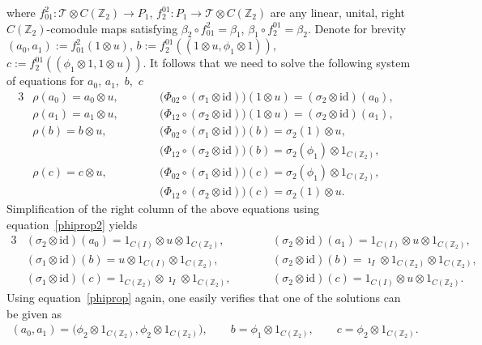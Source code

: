 \documentclass[pdftex]{sigma}
\begin{document}
where $f^2_{01}:{\mathcal{T}}\otimes C({\mathbb Z_2})\rightarrow P_1$, $f^{01}_2:P_1\rightarrow {\mathcal{T}}\otimes
C({\mathbb Z_2})$ are any linear, unital, right $C({\mathbb Z_2})$-comodule maps satisfying $\beta_2\circ
f^2_{01}=\beta_1$, $\beta_1\circ f^{01}_2=\beta_2$. Denote for brevity $(a_0,a_1):=f^2_{01}(1\otimes u)$,
$b:=f^{01}_2((1\otimes u,\phi_1\otimes 1))$, $c:=f^{01}_2((\phi_1\otimes1,1\otimes u))$.
It follows that we need to solve the following system of equations for $a_0$, $a_1$,~$b$,~$c$
\begin{alignat*}{3}
&\rho(a_0) =a_0\otimes u, \qquad&&  \big(\Phi_{02}\circ(\sigma_1\otimes\mathrm{id})\big)(1\otimes u) =(\sigma_2\otimes\mathrm{id})(a_0),&
\\
&\rho(a_1) =a_1\otimes u,  \qquad&&  \big(\Phi_{12}\circ(\sigma_2\otimes\mathrm{id})\big)(1\otimes u) =(\sigma_2\otimes\mathrm{id})(a_1),&
\\
&\rho(b) =b\otimes u,  \qquad&&  \big(\Phi_{02}\circ(\sigma_1\otimes\mathrm{id})\big)(b) =\sigma_2(1)\otimes u,&
\\
&&&
\big(\Phi_{12}\circ(\sigma_2\otimes\mathrm{id})\big)(b) =\sigma_2(\phi_1)\otimes 1_{C({\mathbb Z_2})},&
\\
& \rho(c) =c\otimes u,  \qquad&&  \big(\Phi_{02}\circ(\sigma_1\otimes\mathrm{id})\big)(c) =\sigma_2(\phi_1)\otimes 1_{C({\mathbb Z_2})},&
\\
&&&
\big(\Phi_{12}\circ(\sigma_2\otimes\mathrm{id})\big)(c) =\sigma_2(1)\otimes u.&
\end{alignat*}
Simplif\/ication of the right column of the above equations using equation~\eqref{phiprop2} yields
\begin{alignat*}{3}
&(\sigma_2\otimes\mathrm{id})(a_0) =1_{C(I)}\otimes u\otimes 1_{C({\mathbb Z_2})},
\qquad&&
(\sigma_2\otimes\mathrm{id})(a_1) =1_{C(I)}\otimes u\otimes 1_{C({\mathbb Z_2})},&
\\
&(\sigma_1\otimes\mathrm{id})(b) =u\otimes 1_{C(I)}\otimes 1_{C({\mathbb Z_2})},
\qquad&&
(\sigma_2\otimes\mathrm{id})(b) =\imath_I\otimes 1_{C({\mathbb Z_2})} \otimes 1_{C({\mathbb Z_2})},&
\\
&(\sigma_1\otimes\mathrm{id})(c) =1_{C({\mathbb Z_2})}\otimes \imath_I\otimes 1_{C({\mathbb Z_2})},
\qquad&&
(\sigma_2\otimes\mathrm{id})(c) =1_{C(I)}\otimes u\otimes 1_{C({\mathbb Z_2})}.&
\end{alignat*}
Using equation~\eqref{phiprop} again, one easily verif\/ies that one of the solutions can be given as
\begin{gather*}
(a_0,a_1)=\big(\phi_2\otimes 1_{C({\mathbb Z_2})},\phi_2\otimes 1_{C({\mathbb Z_2})}\big),
\qquad
b=\phi_1\otimes 1_{C({\mathbb Z_2})},
\qquad
c=\phi_2\otimes 1_{C({\mathbb Z_2})}.
\end{gather*}
\end{document}
